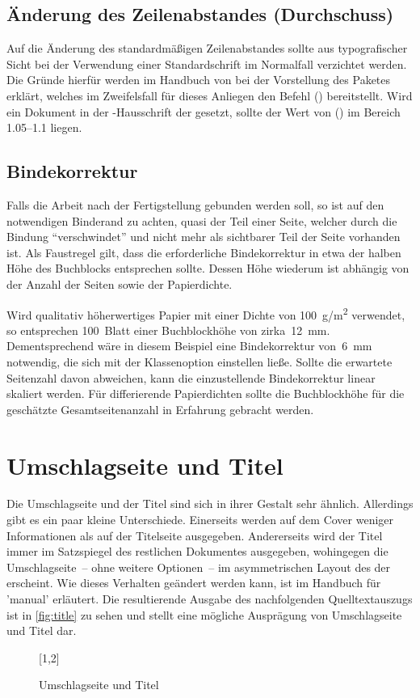\documentclass[%
  english,ngerman,%
  cdgeometry=no,DIV=12,automark%
]{tudscrartcl}
\begin{document}
\subsection{Änderung des Zeilenabstandes (Durchschuss)}
Auf die Änderung des standardmäßigen Zeilenabstandes sollte aus typografischer 
Sicht bei der Verwendung einer Standardschrift im Normalfall verzichtet werden. 
Die Gründe hierfür werden im Handbuch von \TUDScript bei der Vorstellung des 
Paketes  erklärt, welches im Zweifelsfall für dieses Anliegen 
den Befehl () bereitstellt. Wird ein 
Dokument in der \OpenSans-Hausschrift der \TnUD gesetzt, sollte der Wert von 
() im Bereich 1.05--1.1 liegen.

\subsection{Bindekorrektur}
\label{sec:bcor}%
%
Falls die Arbeit nach der Fertigstellung gebunden werden soll, so ist auf den 
notwendigen Binderand zu achten, quasi der Teil einer Seite, welcher durch die 
Bindung \enquote{verschwindet} und nicht mehr als sichtbarer Teil der Seite 
vorhanden ist. Als Faustregel gilt, dass die erforderliche Bindekorrektur in 
etwa der halben Höhe des Buchblocks entsprechen sollte. Dessen Höhe wiederum 
ist abhängig von der Anzahl der Seiten sowie der Papierdichte.

Wird qualitativ höherwertiges Papier mit einer Dichte von \SI{100}{g/m^2} 
verwendet, so entsprechen 100~Blatt einer Buchblockhöhe von zirka~\SI{12}{mm}. 
Dementsprechend wäre in diesem Beispiel eine Bindekorrektur von~\SI{6}{mm} 
notwendig, die sich mit der Klassenoption  einstellen ließe. 
Sollte die erwartete Seitenzahl davon abweichen, kann die einzustellende 
Bindekorrektur linear skaliert werden. Für differierende Papierdichten sollte 
die Buchblockhöhe für die geschätzte Gesamtseitenanzahl in Erfahrung gebracht 
werden.



\section{Umschlagseite und Titel}
Die Umschlagseite und der Titel sind sich in ihrer Gestalt sehr ähnlich. 
Allerdings gibt es ein paar kleine Unterschiede. Einerseits werden auf dem 
Cover weniger Informationen als auf der Titelseite ausgegeben. Andererseits 
wird der Titel immer im Satzspiegel des restlichen Dokumentes ausgegeben, 
wohingegen die Umschlagseite~-- ohne weitere Optionen~-- im asymmetrischen 
Layout des \CDs der \TnUD erscheint. Wie dieses Verhalten geändert werden kann, 
ist im Handbuch für 'manual' erläutert. Die resultierende 
Ausgabe des nachfolgenden Quelltextauszugs ist in \autoref{fig:title} zu sehen 
und stellt eine mögliche Ausprägung von Umschlagseite und Titel dar.
%
\begin{figure}
[1,2]
\caption{Umschlagseite und Titel}
\label{fig:title}
\end{figure}
\end{document}

